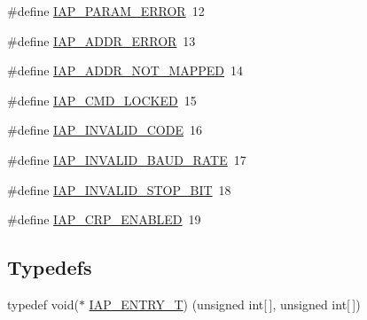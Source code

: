 \begin{DoxyCompactItemize}
\item 
\#define \hyperlink{group___c_o_m_m_o_n___i_a_p_ga6bf1bec9cbb419f8006447171e9750b7}{I\+A\+P\+\_\+\+P\+A\+R\+A\+M\+\_\+\+E\+R\+R\+OR}~12
\item 
\#define \hyperlink{group___c_o_m_m_o_n___i_a_p_gaaff51c256373e4a20f8dab1adc1300f3}{I\+A\+P\+\_\+\+A\+D\+D\+R\+\_\+\+E\+R\+R\+OR}~13
\item 
\#define \hyperlink{group___c_o_m_m_o_n___i_a_p_ga4cfd7e0c133c450664f0a60bfbbd9eaa}{I\+A\+P\+\_\+\+A\+D\+D\+R\+\_\+\+N\+O\+T\+\_\+\+M\+A\+P\+P\+ED}~14
\item 
\#define \hyperlink{group___c_o_m_m_o_n___i_a_p_gafdceac1acd5c460094011136c08574a4}{I\+A\+P\+\_\+\+C\+M\+D\+\_\+\+L\+O\+C\+K\+ED}~15
\item 
\#define \hyperlink{group___c_o_m_m_o_n___i_a_p_ga456a8363a47d21d7198056da4b1e9f61}{I\+A\+P\+\_\+\+I\+N\+V\+A\+L\+I\+D\+\_\+\+C\+O\+DE}~16
\item 
\#define \hyperlink{group___c_o_m_m_o_n___i_a_p_ga6913ca0660dc1a2cccd8c6b09bcdbc75}{I\+A\+P\+\_\+\+I\+N\+V\+A\+L\+I\+D\+\_\+\+B\+A\+U\+D\+\_\+\+R\+A\+TE}~17
\item 
\#define \hyperlink{group___c_o_m_m_o_n___i_a_p_ga6c61111082b04ba6780151c83f8c3644}{I\+A\+P\+\_\+\+I\+N\+V\+A\+L\+I\+D\+\_\+\+S\+T\+O\+P\+\_\+\+B\+IT}~18
\item 
\#define \hyperlink{group___c_o_m_m_o_n___i_a_p_gaaccc191ce402e19b0c0ae399f614efe8}{I\+A\+P\+\_\+\+C\+R\+P\+\_\+\+E\+N\+A\+B\+L\+ED}~19
\end{DoxyCompactItemize}
\subsection*{Typedefs}
\begin{DoxyCompactItemize}
\item 
typedef void($\ast$ \hyperlink{group___c_o_m_m_o_n___i_a_p_gacbe9c7d2b4580da682f004b2c043f221}{I\+A\+P\+\_\+\+E\+N\+T\+R\+Y\+\_\+T}) (unsigned int\mbox{[}$\,$\mbox{]}, unsigned int\mbox{[}$\,$\mbox{]})
\end{DoxyCompactItemize}
